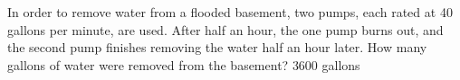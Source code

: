 {In order to remove water from a flooded basement, two pumps, each rated at 40 gallons per minute, are used. After half an hour, the one pump burns out, and the second pump finishes removing the water half an hour later.  How many gallons of water were removed from the basement?}
{3600 gallons}